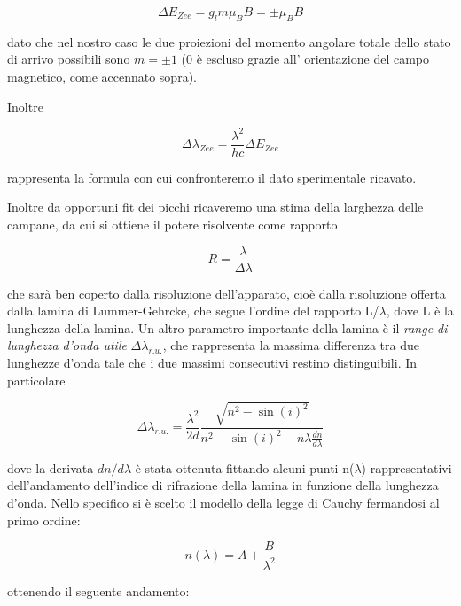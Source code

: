 \documentclass{article}
\begin{document}
	\begin{equation}
		\Delta E_{Zee} = g_l m \mu_B B = \pm \mu_B B
	\end{equation}
	
	
	dato che nel nostro caso le due proiezioni del momento angolare totale
	dello stato di arrivo possibili sono $m = \pm 1$ (0 è escluso grazie all'
	orientazione del campo magnetico, come accennato sopra).
	
	Inoltre
	
	\begin{equation}
		\Delta\lambda_{Zee} = \frac{\lambda^2}{hc}\Delta E_{Zee}
	\end{equation}
	
	rappresenta la formula con cui confronteremo il dato sperimentale
	ricavato.
	
	Inoltre da opportuni fit dei picchi ricaveremo una stima della larghezza
	delle campane, da cui si ottiene il potere risolvente come rapporto
	
	\begin{equation}
		R = \frac{\lambda}{\Delta\lambda}    
	\end{equation}
	
	che sarà ben coperto dalla risoluzione dell'apparato, cioè dalla
	risoluzione offerta dalla lamina di Lummer-Gehrcke, che segue l'ordine
	del rapporto L/$\lambda$, dove L è la lunghezza della lamina.
	Un altro parametro importante della lamina è il \textit{range di 
		lunghezza d'onda utile} $\Delta\lambda_{r.u.}$, che rappresenta la
	massima differenza tra due lunghezze d'onda tale che i due massimi 
	consecutivi restino distinguibili. In particolare
	
	\begin{equation}
		\label{eqn:dlru}
		\Delta\lambda_{r.u.} = \frac{\lambda^2}{2d}\frac{\sqrt{n^2-\sin(i)^2}}{n^2-\sin(i)^2-n\lambda\frac{dn}{d\lambda}}
	\end{equation}
	
	dove la derivata $dn/d\lambda$ è stata ottenuta fittando alcuni punti 
	n($\lambda$) rappresentativi dell'andamento dell'indice di rifrazione
	della lamina in funzione della lunghezza d'onda. Nello specifico si è
	scelto il modello della legge di Cauchy fermandosi al primo ordine:

	\begin{equation}
		n(\lambda) = A + \frac{B}{\lambda^2}    
	\end{equation}


	ottenendo il seguente andamento:
	
\end{document}
